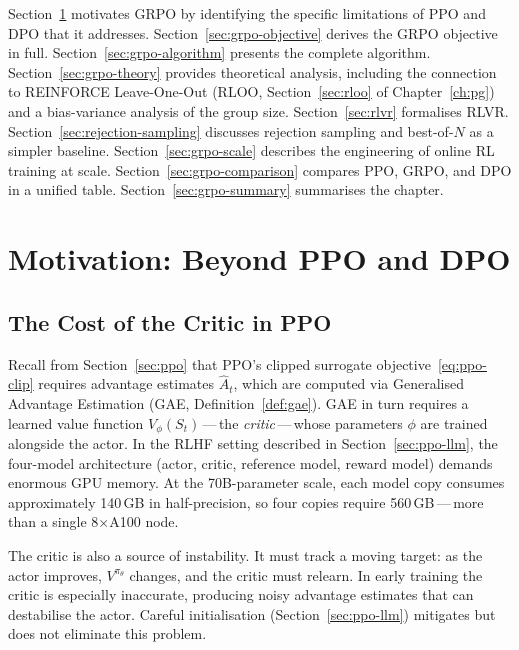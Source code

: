 Section~\ref{sec:grpo-motivation} motivates GRPO by identifying the specific limitations of PPO and DPO that it addresses.  Section~\ref{sec:grpo-objective} derives the GRPO objective in full.  Section~\ref{sec:grpo-algorithm} presents the complete algorithm.  Section~\ref{sec:grpo-theory} provides theoretical analysis, including the connection to REINFORCE Leave-One-Out (RLOO, Section~\ref{sec:rloo} of Chapter~\ref{ch:pg}) and a bias-variance analysis of the group size.  Section~\ref{sec:rlvr} formalises RLVR.  Section~\ref{sec:rejection-sampling} discusses rejection sampling and best-of-$N$ as a simpler baseline.  Section~\ref{sec:grpo-scale} describes the engineering of online RL training at scale.  Section~\ref{sec:grpo-comparison} compares PPO, GRPO, and DPO in a unified table.  Section~\ref{sec:grpo-summary} summarises the chapter.

\section{Motivation: Beyond PPO and DPO}
\label{sec:grpo-motivation}

\subsection{The Cost of the Critic in PPO}

Recall from Section~\ref{sec:ppo} that PPO's clipped surrogate objective~\eqref{eq:ppo-clip} requires advantage estimates $\hat{A}_t$, which are computed via Generalised Advantage Estimation (GAE, Definition~\ref{def:gae}).  GAE in turn requires a learned value function $V_\phi(S_t)$\,---\,the \emph{critic}\,---\,whose parameters $\phi$ are trained alongside the actor.  In the RLHF setting described in Section~\ref{sec:ppo-llm}, the four-model architecture (actor, critic, reference model, reward model) demands enormous GPU memory.  At the 70B-parameter scale, each model copy consumes approximately 140\,GB in half-precision, so four copies require 560\,GB\,---\,more than a single 8$\times$A100 node.

The critic is also a source of instability.  It must track a moving target: as the actor improves, $V^{\pi_\theta}$ changes, and the critic must relearn.  In early training the critic is especially inaccurate, producing noisy advantage estimates that can destabilise the actor.  Careful initialisation (Section~\ref{sec:ppo-llm}) mitigates but does not eliminate this problem.

